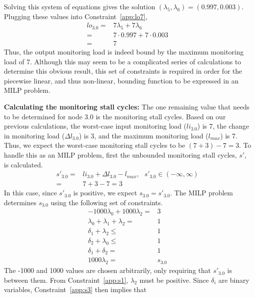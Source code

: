Solving this system of equations gives the solution $(\lambda_5, \lambda_6) = (0.997, 0.003)$. Plugging these values into Constraint~\ref{app:lo7},
\begin{align*}
  lo_{3.0} =& 7\lambda_5 + 7\lambda_6 \\
  =& 7\cdot 0.997 + 7\cdot 0.003 \\
  =& 7
\end{align*}
Thus, the output monitoring load is indeed bound by the maximum monitoring load
of 7. Although this may seem to be a complicated series of calculations to
determine this obvious result, this set of constraints is required in order for
the piecewise linear, and thus non-linear, bounding function to be expressed
in an MILP problem.

{\bf Calculating the monitoring stall cycles:} The one remaining value that
needs to be determined for node 3.0 is the monitoring stall cycles. Based on
our previous calculations, the worst-case input monitoring load ($li_{3.0}$) is 7, the
change in monitoring load ($\Delta l_{3.0}$) is 3, and the maximum monitoring load ($l_{max}$) is 7. Thus, we
expect the worst-case monitoring stall cycles to be $(7+3)-7 = 3$. To handle this as an
MILP problem, first the unbounded monitoring stall cycles, $s'$, is calculated.
\begin{align*}
  s'_{3.0} =& li_{3.0} + \Delta l_{3.0} - l_{max}, \text{ } s'_{3.0} \in (-\infty, \infty) \\
  =& 7 + 3 - 7 = 3
\end{align*}
In this case, since $s'_{3.0}$ is positive, we expect $s_{3.0} = s'_{3.0}$. The MILP problem
determines $s_{3.0}$ using the following set of constraints.
\begin{subequations}
\begin{align}
  -1000\lambda_0 + 1000\lambda_2 =& 3 \label{app:s1}\\
  \lambda_0 + \lambda_1 + \lambda_2 =& 1 \label{app:s2}\\
  \delta_1 + \lambda_2 \leq& 1 \label{app:s3}\\
  \delta_2 + \lambda_0 \leq& 1 \label{app:s4}\\
  \delta_1 + \delta_2 =& 1 \label{app:s5}\\
  1000\lambda_2 =& s_{3.0} \label{app:s6}
\end{align}
\end{subequations}
The -1000 and 1000 values are chosen arbitrarily, only requiring that
$s'_{3.0}$ is between them. From Constraint~\ref{app:s1}, $\lambda_2$ must be
positive. Since $\delta_i$ are binary variables, Constraint~\ref{app:s3} then implies that
